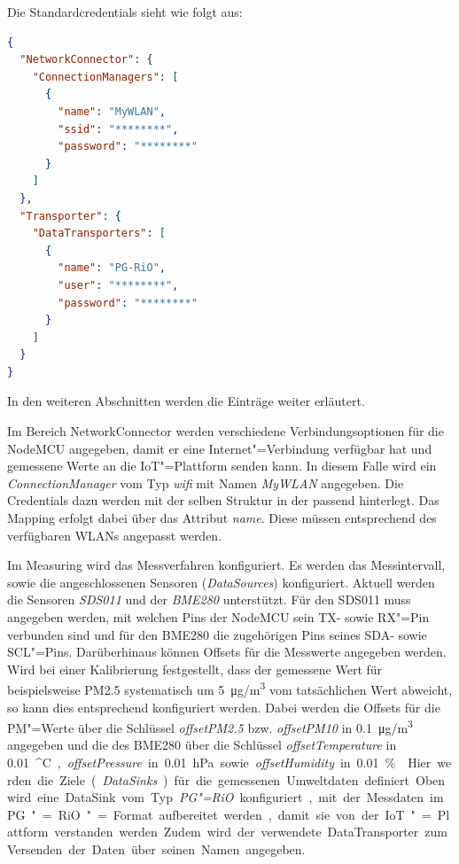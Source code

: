 Die Standardcredentials sieht wie folgt aus:

\begin{lstlisting}[language=json,basicstyle=\footnotesize]
{
  "NetworkConnector": {
    "ConnectionManagers": [
      {
        "name": "MyWLAN",
        "ssid": "********",
        "password": "********"
      }
    ]
  },
  "Transporter": {
    "DataTransporters": [
      {
        "name": "PG-RiO",
        "user": "********",
        "password": "********"
      }
    ]
  }
}
\end{lstlisting}

In den weiteren Abschnitten werden die Einträge weiter erläutert.

Im Bereich NetworkConnector werden verschiedene Verbindungsoptionen für die NodeMCU angegeben, damit er eine Internet"=Verbindung verfügbar hat und gemessene Werte an die IoT"=Plattform senden kann.
In diesem Falle wird ein \textit{ConnectionManager} vom Typ \textit{wifi} mit Namen \textit{MyWLAN} angegeben.
Die Credentials dazu werden mit der selben Struktur in der  passend hinterlegt.
Das Mapping erfolgt dabei über das Attribut \textit{name}.
Diese müssen entsprechend des verfügbaren WLANs angepasst werden.

Im Measuring wird das Messverfahren konfiguriert.
Es werden das Messintervall, sowie die angeschlossenen Sensoren (\textit{DataSources}) konfiguriert.
Aktuell werden die Sensoren \textit{SDS011} und der \textit{BME280} unterstützt.
Für den SDS011 muss angegeben werden, mit welchen Pins der NodeMCU sein TX- sowie RX"=Pin verbunden sind und für den BME280 die zugehörigen Pins seines SDA- sowie SCL"=Pins.
Darüberhinaus können Offsets für die Messwerte angegeben werden.
Wird bei einer Kalibrierung festgestellt, dass der gemessene Wert für beispielsweise PM2.5 systematisch um \SI{5}{\micro g/m^3} vom tatsächlichen Wert abweicht, so kann dies entsprechend konfiguriert werden.
Dabei werden die Offsets für die PM"=Werte über die Schlüssel \textit{offsetPM2.5} bzw. \textit{offsetPM10} in \SI{0,1}{\micro g/m^3} angegeben und die des BME280 über die Schlüssel \textit{offsetTemperature} in \SI{0,01}{^{\circ}C}, \textit{offsetPressure} in \SI{0,01}{hPa} sowie \textit{offsetHumidity} in \SI{0,01}{\%}.

Hier werden die Ziele (\textit{DataSinks}) für die gemessenen Umweltdaten definiert.
Oben wird eine DataSink vom Typ \textit{PG"=RiO} konfiguriert, mit der Messdaten im PG"=RiO"=Format aufbereitet werden, damit sie von der IoT"=Plattform verstanden werden.
Zudem wird der verwendete DataTransporter zum Versenden der Daten über seinen Namen angegeben.

